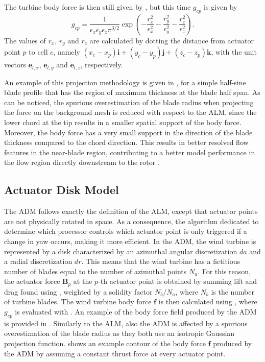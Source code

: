 The turbine body force is then still given by , but this time $g_{cp}$ is given by 
\begin{equation}
	g_{cp} = \frac{1}{\epsilon_x \epsilon_y \epsilon_z \pi^{3/2}}\exp\left(-\frac{r_x^2}{\epsilon_x^2}-\frac{r_y^2}{\epsilon_y^2}-\frac{r_z^2}{\epsilon_z^2}\right).  \label{eq:gaussAnisotropProjection}
\end{equation}
The values of $r_x$, $r_y$ and $r_z$ are calculated by dotting the distance from actuator point $p$ to cell $c$, namely $(x_c - x_p)\mathbf{i} + (y_c - y_p)\mathbf{j} + (z_c - z_p)\mathbf{k}$, with the unit vectors $\mathbf{e}_{l,x}$, $\mathbf{e}_{l,y}$ and $\mathbf{e}_{l,z}$, respectively.

An example of this projection methodology is given in , for a simple half-sine blade profile that has the region of maximum thickness at the blade half span. As can be noticed, the spurious overestimation of the blade radius when projecting the force on the background mesh is reduced with respect to the ALM, since the lower chord at the tip results in a smaller spatial support of the body force. Moreover, the body force has a very small support in the direction of the blade thickness compared to the chord direction. This results in better resolved flow features in the near-blade region, contributing to a better model performance in the flow region directly downstream to the rotor \citep{ChurchfieldEtAl2017}.

\subsection{Actuator Disk Model}
\label{subsec:actuatorDiskModel}
The ADM follows exactly the definition of the ALM, except that actuator points are not physically rotated in space. As a consequence, the algorithm dedicated to determine which processor controls which actuator point is only triggered if a change in yaw occurs, making it more efficient. In the ADM, the wind turbine is represented by a disk characterized by an azimuthal angular discretization $da$ and a radial discretization $dr$. This means that the wind turbine has a fictitious number of blades equal to the number of azimuthal points $N_a$. For this reason, the actuator force $\mathbf{B}_p$ at the $p$-th actuator point is obtained by summing lift and drag found using , weighted by a solidity factor $N_b/N_a$, where $N_b$ is the number of turbine blades. The wind turbine body force $\mathbf{f}$ is then calculated using , where $g_{cp}$ is evaluated with . An example of the body force field produced by the ADM is provided in . Similarly to the ALM, also the ADM is affected by a spurious overestimation of the blade radius as they both use an isotropic Gaussian projection function.  shows an example contour of the body force $\mathbf{f}$ produced by the ADM by assuming a constant thrust force at every actuator point.

